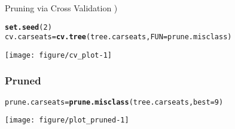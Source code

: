 \documentclass[handout]{beamer}\usepackage[]{graphicx}\usepackage[]{color}
\makeatletter
\def\maxwidth{ %
  \ifdim\Gin@nat@width>\linewidth
    \linewidth
  \else
    \Gin@nat@width
  \fi
}
\newcommand{\hlnum}[1]{\textcolor[rgb]{0.686,0.059,0.569}{#1}}%
\newcommand{\hlstd}[1]{\textcolor[rgb]{0.345,0.345,0.345}{#1}}%
\newcommand{\hlkwb}[1]{\textcolor[rgb]{0.69,0.353,0.396}{#1}}%
\newcommand{\hlkwc}[1]{\textcolor[rgb]{0.333,0.667,0.333}{#1}}%
\newcommand{\hlkwd}[1]{\textcolor[rgb]{0.737,0.353,0.396}{\textbf{#1}}}%
\newenvironment{kframe}{%
 \def\at@end@of@kframe{}%
 \ifinner\ifhmode%
  \def\at@end@of@kframe{\end{minipage}}%
  \begin{minipage}{\columnwidth}%
 \fi\fi%
 \def\FrameCommand##1{\hskip\@totalleftmargin \hskip-\fboxsep
 \colorbox{shadecolor}{##1}\hskip-\fboxsep
     \hskip-\linewidth \hskip-\@totalleftmargin \hskip\columnwidth}%
 \MakeFramed {\advance\hsize-\width
   \@totalleftmargin\z@ \linewidth\hsize
   \@setminipage}}%
 {\par\unskip\endMakeFramed%
 \at@end@of@kframe}
\newenvironment{knitrout}{}{} %
\makeatother
\begin{document}
\begin{frame}[fragile]{Pruning via Cross Validation )}
\begin{knitrout}
\color{fgcolor}\begin{kframe}
\begin{alltt}
\hlkwd{set.seed}\hlstd{(}\hlnum{2}\hlstd{)}
\hlstd{cv.carseats} \hlkwb{=} \hlkwd{cv.tree}\hlstd{(tree.carseats,} \hlkwc{FUN}\hlstd{=prune.misclass)}
\end{alltt}
\end{kframe}
\end{knitrout}

\vspace{-.5in}
\begin{knitrout}
\color{fgcolor}
\texttt{[image: figure/cv\_plot-1]} 

\end{knitrout}

\end{frame}




\begin{frame}[fragile]\frametitle{Pruned}

\begin{knitrout}
\color{fgcolor}\begin{kframe}
\begin{alltt}
\hlstd{prune.carseats} \hlkwb{=} \hlkwd{prune.misclass}\hlstd{(tree.carseats ,}\hlkwc{best} \hlstd{=}\hlnum{9}\hlstd{)}
\end{alltt}
\end{kframe}
\end{knitrout}

\begin{knitrout}
\color{fgcolor}
\texttt{[image: figure/plot\_pruned-1]} 

\end{knitrout}

\end{frame}
\end{document}
